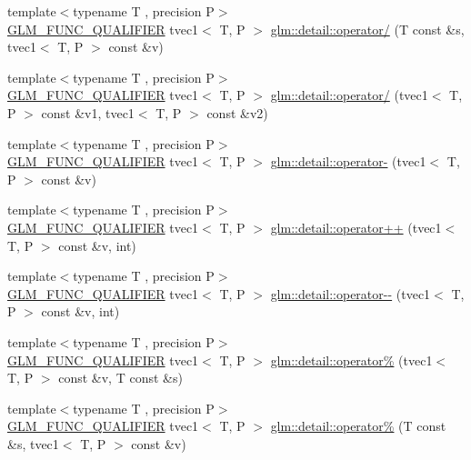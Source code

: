 \begin{DoxyCompactItemize}
{\footnotesize template$<$typename T , precision P$>$ }\\\hyperlink{setup_8hpp_a33fdea6f91c5f834105f7415e2a64407}{G\+L\+M\+\_\+\+F\+U\+N\+C\+\_\+\+Q\+U\+A\+L\+I\+F\+I\+ER} tvec1$<$ T, P $>$ \hyperlink{namespaceglm_1_1detail_af9f5332d7a644f853131625258756e00}{glm\+::detail\+::operator/} (T const \&s, tvec1$<$ T, P $>$ const \&v)
\item 
{\footnotesize template$<$typename T , precision P$>$ }\\\hyperlink{setup_8hpp_a33fdea6f91c5f834105f7415e2a64407}{G\+L\+M\+\_\+\+F\+U\+N\+C\+\_\+\+Q\+U\+A\+L\+I\+F\+I\+ER} tvec1$<$ T, P $>$ \hyperlink{namespaceglm_1_1detail_af9131638f2ea621b1494466b19c42488}{glm\+::detail\+::operator/} (tvec1$<$ T, P $>$ const \&v1, tvec1$<$ T, P $>$ const \&v2)
\item 
{\footnotesize template$<$typename T , precision P$>$ }\\\hyperlink{setup_8hpp_a33fdea6f91c5f834105f7415e2a64407}{G\+L\+M\+\_\+\+F\+U\+N\+C\+\_\+\+Q\+U\+A\+L\+I\+F\+I\+ER} tvec1$<$ T, P $>$ \hyperlink{namespaceglm_1_1detail_a01dbc432d4c74553128c9251ffd09ea2}{glm\+::detail\+::operator-\/} (tvec1$<$ T, P $>$ const \&v)
\item 
{\footnotesize template$<$typename T , precision P$>$ }\\\hyperlink{setup_8hpp_a33fdea6f91c5f834105f7415e2a64407}{G\+L\+M\+\_\+\+F\+U\+N\+C\+\_\+\+Q\+U\+A\+L\+I\+F\+I\+ER} tvec1$<$ T, P $>$ \hyperlink{namespaceglm_1_1detail_ad5a11850399f15887b9028a940ce4ce6}{glm\+::detail\+::operator++} (tvec1$<$ T, P $>$ const \&v, int)
\item 
{\footnotesize template$<$typename T , precision P$>$ }\\\hyperlink{setup_8hpp_a33fdea6f91c5f834105f7415e2a64407}{G\+L\+M\+\_\+\+F\+U\+N\+C\+\_\+\+Q\+U\+A\+L\+I\+F\+I\+ER} tvec1$<$ T, P $>$ \hyperlink{namespaceglm_1_1detail_ac5aaff18cd84f4212b81c9fe632e2c43}{glm\+::detail\+::operator-\/-\/} (tvec1$<$ T, P $>$ const \&v, int)
\item 
{\footnotesize template$<$typename T , precision P$>$ }\\\hyperlink{setup_8hpp_a33fdea6f91c5f834105f7415e2a64407}{G\+L\+M\+\_\+\+F\+U\+N\+C\+\_\+\+Q\+U\+A\+L\+I\+F\+I\+ER} tvec1$<$ T, P $>$ \hyperlink{namespaceglm_1_1detail_ac77f28a50ae5084b8ecae7227de2c9e6}{glm\+::detail\+::operator\%} (tvec1$<$ T, P $>$ const \&v, T const \&s)
\item 
{\footnotesize template$<$typename T , precision P$>$ }\\\hyperlink{setup_8hpp_a33fdea6f91c5f834105f7415e2a64407}{G\+L\+M\+\_\+\+F\+U\+N\+C\+\_\+\+Q\+U\+A\+L\+I\+F\+I\+ER} tvec1$<$ T, P $>$ \hyperlink{namespaceglm_1_1detail_a093b41923d91247c0b40e926d8c0cfe9}{glm\+::detail\+::operator\%} (T const \&s, tvec1$<$ T, P $>$ const \&v)

\end{DoxyCompactItemize}
